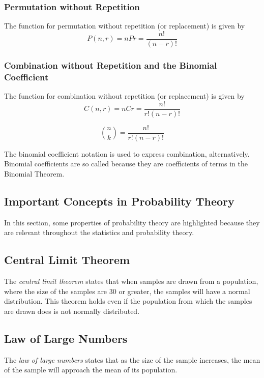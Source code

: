 \documentclass{article}
\begin{document}
\subsubsection{Permutation without Repetition}
The function for permutation without repetition (or replacement) is given by
$$
P(n,r) = nPr = \frac{n!}{(n-r)!}
$$

\subsubsection{Combination without Repetition and the Binomial Coefficient}
The function for combination without repetition (or replacement) is given by
$$
C(n,r) = nCr = \frac{n!}{r!(n-r)!}
$$ 

 
$$
\binom{n}{k} = \frac{n!}{r!(n-r)!}
$$ 

The binomial coefficient notation is used to express combination, alternatively. Binomial coefficients are so called because they are coefficients of terms in the Binomial Theorem.

\subsection{Important Concepts in Probability Theory}
In this section, some properties of probability theory are highlighted because they are relevant throughout the statistics and probability theory.

\subsection{Central Limit Theorem}
The \emph{central limit theorem} states that when samples are drawn from a population, where the size of the samples are 30 or greater, the samples will have a normal distribution. This theorem holds even if the population from which the samples are drawn does is not normally distributed.

\subsection{Law of Large Numbers}
The \emph{law of large numbers} states that as the size of the sample increases, the mean of the sample will approach the mean of its population.
\end{document}

